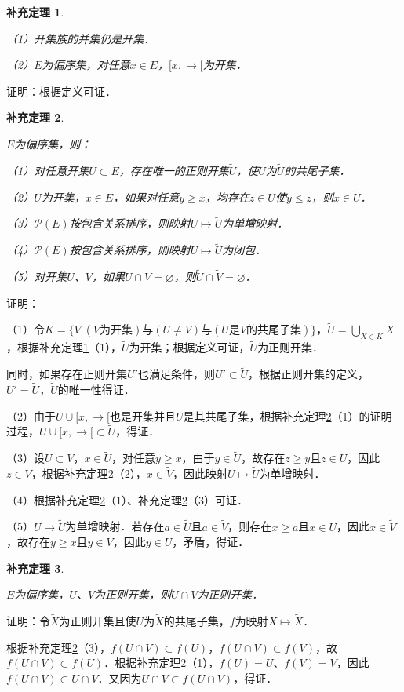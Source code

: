 \documentclass[12pt, a4paper, oneside]{book}
\newtheorem{cor}{补充定理}
\begin{document}
			\begin{cor}\label{cor206}
				\hfill\par
				（1）开集族的并集仍是开集．
				\par
				（2）$E$为偏序集，对任意$x\in E$，$[x, \to [$为开集．
			\end{cor}
			证明：根据定义可证．
			
			\begin{cor}\label{cor207}
				\hfill\par
				$E$为偏序集，则：
				\par
				（1）对任意开集$U\subset E$，存在唯一的正则开集$\tilde{U}$，使$U$为$\tilde{U}$的共尾子集．
				\par
				（2）$U$为开集，$x\in E$，如果对任意$y\geq x$，均存在$z\in U$使$y\leq z$，则$x\in \tilde{U}$．
				\par
				（3）$\mathcal{P}(E)$按包含关系排序，则映射$U\mapsto \tilde{U}$为单增映射．
				\par
				（4）$\mathcal{P}(E)$按包含关系排序，则映射$U\mapsto \tilde{U}$为闭包．
				\par
				（5）对开集$U$、$V$，如果$U\cap V=\varnothing$，则$\tilde{U}\cap \tilde{V}=\varnothing$．
			\end{cor}
			证明：
			\par
			（1）令$K=\{V|(V\text{为开集})\text{与}(U\neq V)\text{与}(U\text{是}V\text{的共尾子集})\}$，$\tilde{U}=\bigcup\limits_{X\in K}X$，根据补充定理\ref{cor206}（1），$\tilde{U}$为开集；根据定义可证，$\tilde{U}$为正则开集．
			\par
			同时，如果存在正则开集$U'$也满足条件，则$U'\subset \tilde{U}$，根据正则开集的定义，$U'=\tilde{U}$，$\tilde{U}$的唯一性得证．
			\par
			（2）由于$U\cup [x, \to [$也是开集并且$U$是其共尾子集，根据补充定理\ref{cor207}（1）的证明过程，$U\cup [x, \to [\subset \tilde{U}$，得证．
			\par
			（3）设$U\subset V$，$x\in \tilde{U}$，对任意$y\geq x$，由于$y\in \tilde{U}$，故存在$z\geq y$且$z\in U$，因此$z\in V$，根据补充定理\ref{cor207}（2），$x\in \tilde{V}$，因此映射$U\mapsto \tilde{U}$为单增映射．
			\par
			（4）根据补充定理\ref{cor207}（1）、补充定理\ref{cor207}（3）可证．
			\par
			（5）$U\mapsto \tilde{U}$为单增映射．若存在$a\in \tilde{U}$且$a\in \tilde{V}$，则存在$x\geq a$且$x\in U$，因此$x\in \tilde{V}$，故存在$y\geq x$且$y\in V$，因此$y\in U$，矛盾，得证．
			
			\begin{cor}\label{cor208}
				\hfill\par
				$E$为偏序集，$U$、$V$为正则开集，则$U\cap V$为正则开集．
			\end{cor}
			证明：令$\tilde{X}$为正则开集且使$U$为$\tilde{X}$的共尾子集，$f$为映射$X\mapsto \tilde{X}$．
			\par
			根据补充定理\ref{cor207}（3），$f(U\cap V)\subset f(U)$，$f(U\cap V)\subset f(V)$，故$f(U\cap V)\subset f(U)$．根据补充定理\ref{cor207}（1），$f(U)=U$、$f(V)=V$，因此$f(U\cap V)\subset U\cap V$．又因为$U\cap V\subset f(U\cap V)$，得证．
			
\end{document}
